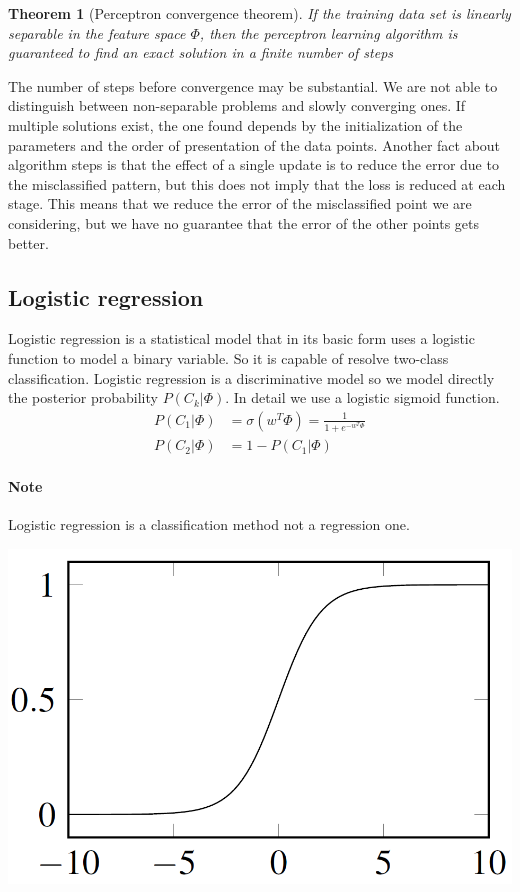 \documentclass[main.tex]{subfiles}
\newtheorem{theorem}{Theorem}[section]
\begin{document}
\begin{theorem}[Perceptron convergence theorem]
If the training data set is linearly separable in the feature space $\Phi$, then the perceptron learning algorithm is guaranteed to find an exact solution in a finite number of steps
\end{theorem}
The number of steps before convergence may be substantial. We are not able to distinguish between non-separable problems and slowly converging ones. If multiple solutions exist, the one found depends by the initialization of the parameters and the order of presentation of the data points.
Another fact about algorithm steps is that the effect of a single update is to reduce the error due to the misclassified pattern, but this does not imply that the loss is reduced at each stage. This means that we reduce the error of the misclassified point we are considering, but we have no guarantee that the error of the other points gets better.

\newpage
\subsection{Logistic regression}
Logistic regression is a statistical model that in its basic form uses a logistic function to model a binary variable. So it is capable of resolve two-class classification.
Logistic regression is a discriminative model so we model directly the posterior probability $P(C_k|\Phi)$. In detail we use a logistic sigmoid function\footnotemark.
\begin{align}
    P(C_1|\Phi) &= \sigma(w^T \Phi) = \frac{1}{1+e^{-w^T\Phi}} \\
    P(C_2|\Phi) &= 1- P(C_1|\Phi)
\end{align}

\paragraph{Note} Logistic regression is a classification method not a regression one.

\begin{center}
    \includegraphics[scale=0.4]{img/Sigmoid.PNG}
\end{center}
\end{document}

